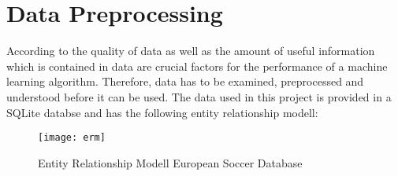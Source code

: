 \chapter{Data Preprocessing}
\label{cha:Preprocessing}


According to \cite[p.~99]{raschka} the quality of data as well as the amount of useful information which is contained in data are crucial factors for the performance of a machine learning algorithm. Therefore, data has to be examined, preprocessed and understood before it can be used. The data used in this project is provided in a SQLite databse and has the following entity relationship modell:

\begin{figure}[H]
\label{fig:ERM}
\begin{center}
\texttt{[image: erm]} %
\end{center}
\caption{Entity Relationship Modell European Soccer Database
}
\end{figure}



